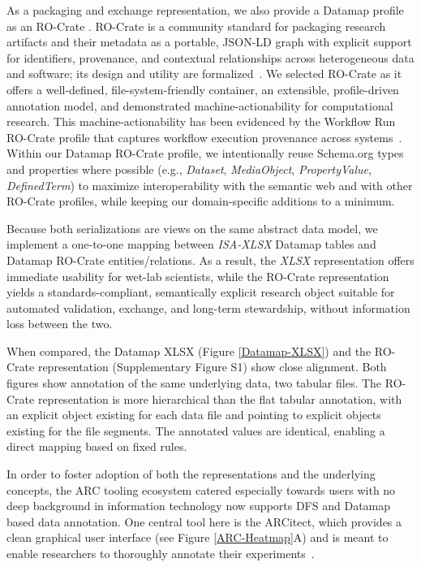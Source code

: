 \documentclass{jib}
\begin{document}
As a packaging and exchange representation, we also provide a Datamap profile as an RO-Crate \cite{wetzels2025datamapro}. RO-Crate is a community standard for packaging research artifacts and their metadata as a portable, JSON-LD graph with explicit support for identifiers, provenance, and contextual relationships across heterogeneous data and software; its design and utility are formalized~\cite{soilandreyes2022rocrate}. We selected RO-Crate as it offers a well-defined, file-system-friendly container, an extensible, profile-driven annotation model, and demonstrated machine-actionability for computational research. This machine-actionability has been evidenced by the Workflow Run RO-Crate profile that captures workflow execution provenance across systems~\cite{leo2024workflowruncrate}. Within our Datamap RO-Crate profile, we intentionally reuse Schema.org types and properties where possible (e.g., \emph{Dataset}, \emph{MediaObject}, \emph{PropertyValue}, \emph{DefinedTerm}) to maximize interoperability with the semantic web and with other RO-Crate profiles, while keeping our domain-specific additions to a minimum.

Because both serializations are views on the same abstract data model, we implement a one-to-one mapping between \emph{ISA-XLSX} Datamap tables and Datamap RO-Crate entities/relations. As a result, the \emph{XLSX} representation offers immediate usability for wet-lab scientists, while the RO-Crate representation yields a standards-compliant, semantically explicit research object suitable for automated validation, exchange, and long-term stewardship, without information loss between the two.

When compared, the Datamap XLSX (Figure \ref{Datamap-XLSX}) and the RO-Crate representation (Supplementary Figure S1) show close alignment. Both figures show annotation of the same underlying data, two tabular files. The RO-Crate representation is more hierarchical than the flat tabular annotation, with an explicit object existing for each data file and pointing to explicit objects existing for the file segments. The annotated values are identical, enabling a direct mapping based on fixed rules.

In order to foster adoption of both the representations and the underlying concepts, the ARC tooling ecosystem catered especially towards users with no deep background in information technology now supports DFS and Datamap based data annotation. One central tool here is the ARCitect, which provides a clean graphical user interface (see Figure \ref{ARC-Heatmap}A) and is meant to enable researchers to thoroughly annotate their experiments~\cite{lukasczyk2025arcitect}.
\end{document}
